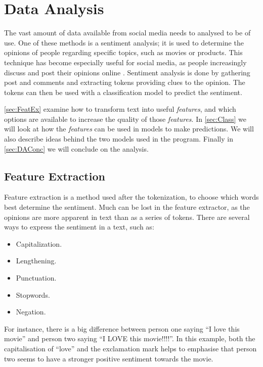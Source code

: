 \chapter{Data Analysis}\label{cha:DA}
The vast amount of data available from social media needs to analysed to be of
use. One of these methods is a sentiment analysis; it is used to determine the
opinions of people regarding specific topics, such as movies or products. This
technique has become especially useful for social media, as people increasingly
discuss and post their opinions online \citep[Overview 2]{Sentiment}. Sentiment
analysis is done by gathering post and comments and extracting tokens providing
clues to the opinion. The tokens can then be used with a classification model to
predict the sentiment.\nl

\autoref{sec:FeatEx} examine how to transform text into useful
\textit{features}, and which options are available to increase the quality of
those \textit{features}. In \autoref{sec:Class} we will look at how the
\textit{features} can be used in models to make predictions. We will also
describe ideas behind the two models used in the program. Finally in
\autoref{sec:DAConc} we will conclude on the analysis.

\section{Feature Extraction}\label{sec:FeatEx}
Feature extraction is a method used after the tokenization, to choose which
words best determine the sentiment. Much can be lost in the feature extractor,
as the opinions are more apparent in text than as a series of tokens. There are
several ways to express the sentiment in a text, such
as\citep[Overview.3-4]{Sentiment}:


\begin{itemize}
  \item Capitalization. 
  \item Lengthening.
  \item Punctuation.
  \item Stopwords.
  \item Negation.
\end{itemize}

For instance, there is a big difference between person one saying ``I love this
movie'' and person two saying ``I LOVE this movie!!!!''. In this example, both
the capitalisation of ``love'' and the exclamation mark helps to emphasise that
person two seems to have a stronger positive sentiment towards the movie.\nl


